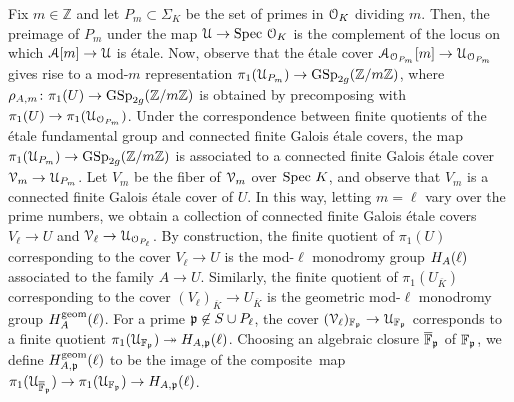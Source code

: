 Fix $m \in \mathbb Z$ and let $P_m \subset \Sigma_K$ be the set of primes in $\mathcal{O}_K$ dividing $m$. Then, the preimage of $P_m$ under the map $\mathcal{U} \to \text{Spec } \mathcal{O}_K$
is the complement of the locus on which $\mathcal{A}[m] \to \mathcal{U}$ is \'etale.
Now, observe that the \'etale cover $\mathcal{A}_{\mathcal O_{P_m}}[m] \to \mathcal{U}_{\mathcal O_{P_m}}$ gives rise to a mod-$m$ representation $\pi_1(\mathcal{U}_{P_m}) \to \operatorname{GSp}_{2g}({\mathbb Z} / m {\mathbb Z})$, where $\rho_{A, m} \colon \pi_1(U) \to \operatorname{GSp}_{2g}({\mathbb Z} / m {\mathbb Z})$ is obtained by precomposing with $\pi_1(U) \to \pi_1(\mathcal{U}_{\mathcal O_{P_m}})$. Under the correspondence between finite quotients of the \'etale fundamental group and connected finite Galois \'etale covers, the map $\pi_1(\mathcal{U}_{P_m}) \to \operatorname{GSp}_{2g}({\mathbb Z} / m {\mathbb Z})$ is associated to a connected finite Galois \'etale cover $\mathcal{V}_m \to \mathcal{U}_{P_m}$. Let $V_m$ be the fiber of $\mathcal{V}_m$ over $\text{Spec } K$, and observe that $V_m$ is a connected finite Galois \'etale cover of $U$.
In this way, letting $m = \ell$ vary over the prime numbers, we obtain a collection of connected finite Galois \'etale covers $V_\ell \to U$ and $\mathcal V_\ell \to \mathcal U_{\mathcal O_{P_\ell}}$. By construction, the finite quotient of $\pi_1(U)$ corresponding to the cover $V_\ell \to U$ is the mod-$\ell$ monodromy group $H_A(\ell)$ associated to the family $A \to U$. Similarly, the finite quotient of $\pi_1(U_{\overline K})$ corresponding to the cover $(V_\ell)_{\overline K} \rightarrow U_{\overline K}$ is the geometric mod-$\ell$ monodromy group $H_A^{\operatorname{geom}}(\ell)$. For a prime ${\mathfrak p} \not\in S \cup P_\ell$, the cover $(\mathcal V_\ell)_{\mathbb F_\mathfrak p} \to \mathcal U_{\mathbb F_\mathfrak p}$
corresponds to a finite quotient $\pi_1(\mathcal U_{\mathbb F_\mathfrak p}) \twoheadrightarrow H_{A,{\mathfrak p}}(\ell)$.
Choosing an algebraic closure $\overline{\mathbb F}_\mathfrak p$ of $\mathbb F_\mathfrak p$, we define $H_{A,\mathfrak p}^{\operatorname{geom}}(\ell)$ to be the image of the \mbox{composite map $\pi_1(\mathcal U_{\overline{\mathbb F}_\mathfrak p}) \to \pi_1(\mathcal U_{\mathbb F_\mathfrak p}) \to H_{A,\mathfrak p}(\ell)$.}
